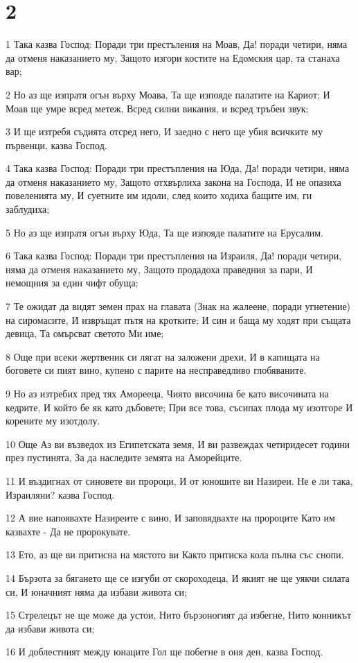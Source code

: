 \chapter{2}

\par 1 Така казва Господ: Поради три престъления на Моав, Да! поради четири, няма да отменя наказанието му, Защото изгори костите на Едомския цар, та станаха вар;
\par 2 Но аз ще изпратя огън върху Моава, Та ще изпояде палатите на Кариот; И Моав ще умре всред метеж, Всред силни викания, и всред тръбен звук;
\par 3 И ще изтребя съдията отсред него, И заедно с него ще убия всичките му първенци, казва Господ.
\par 4 Така казва Господ: Поради три престъпления на Юда, Да! поради четири, няма да отменя наказанието му, Защото отхвърлиха закона на Господа, И не опазиха повеленията му, И суетните им идоли, след които ходиха бащите им, ги заблудиха;
\par 5 Но аз ще изпратя огън върху Юда, Та ще изпояде палатите на Ерусалим.
\par 6 Така казва Господ: Поради три престъпления на Израиля, Да! поради четири, няма да отменя наказанието му, Защото продадоха праведния за пари, И немощния за един чифт обуща;
\par 7 Те ожидат да видят земен прах на главата (Знак на жалеене, поради угнетение) на сиромасите, И извръщат пътя на кротките; И син и баща му ходят при същата девица, Та омърсват светото Ми име;
\par 8 Още при всеки жертвеник си лягат на заложени дрехи, И в капищата на боговете си пият вино, купено с парите на несправедливо глобяваните.
\par 9 Но аз изтребих пред тях Аморееца, Чиято височина бе като височината на кедрите, И който бе як като дъбовете; При все това, съсипах плода му изотгоре И корените му изотдолу.
\par 10 Още Аз ви възведох из Египетската земя, И ви развеждах четиридесет години през пустинята, За да наследите земята на Аморейците.
\par 11 И въздигнах от синовете ви пророци, И от юношите ви Назиреи. Не е ли така, Израиляни? казва Господ.
\par 12 А вие напоявахте Назиреите с вино, И заповядвахте на пророците Като им казвахте - Да не пророкувате.
\par 13 Ето, аз ще ви притисна на мястото ви Както притиска кола пълна със снопи.
\par 14 Бързота за бягането ще се изгуби от скороходеца, И якият не ще уякчи силата си, И юначният няма да избави живота си;
\par 15 Стрелецът не ще може да устои, Нито бързоногият да избегне, Нито конникът да избави живота си;
\par 16 И доблестният между юнаците Гол ще побегне в оня ден, казва Господ.

